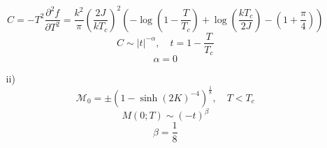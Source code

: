 \documentclass[12pt]{article}
\theoremstyle{definition}
\begin{document}
\begin{enumerate}
\begin{itemize}
        \begin{equation}
            C=-T^2\frac{\partial^2f}{\partial T^2}=\frac{k^2}{\pi}\left(\frac{2J}{kT_c}\right)^2\left(-\log\left(1-\frac{T}{T_c}\right)+\log\left(\frac{kT_c}{2J}\right)-\left(1+\frac{\pi}{4}\right)\right)
        \end{equation}
        \begin{equation}
            C\sim|t|^{-\alpha},\quad t=1-\frac{T}{T_c}
        \end{equation}
        \begin{equation}
            \boxed{\alpha=0}
        \end{equation}
        \item[ii)]
        \begin{equation}
            \mathcal{M}_0=\pm(1-\sinh(2K)^{-4})^\frac{1}{8},\quad T<T_c
        \end{equation}
        \begin{equation}
            M(0;T)\sim(-t)^\beta
        \end{equation}
        \begin{equation}
            \boxed{\beta=\frac{1}{8}}
        \end{equation}
    \end{itemize}
\end{enumerate}
\end{document}

